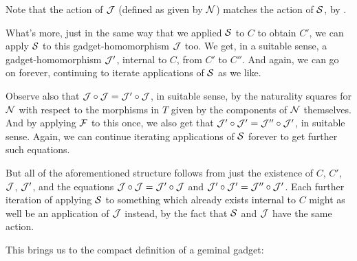 \begin{observation}
Note that the action of $\mathcal{J}$ (defined as given by $\mathcal{N}$) matches the action of $\mathcal{S}$, by .

What's more, just in the same way that we applied $\mathcal{S}$ to $C$ to obtain $C'$, we can apply $\mathcal{S}$ to this gadget-homomorphism $\mathcal{J}$ too. We get, in a suitable sense, a gadget-homomorphism $\mathcal{J}'$, internal to $C$, from $C'$ to $C''$. And again, we can go on forever, continuing to iterate applications of $\mathcal{S}$ as we like.

Observe also that $\mathcal{J} \circ \mathcal{J} = \mathcal{J}' \circ \mathcal{J}$, in suitable sense, by the naturality squares for $\mathcal{N}$ with respect to the morphisms in $T$ given by the components of $\mathcal{N}$ themselves. And by applying $\mathcal{F}$ to this once, we also get that $\mathcal{J}' \circ \mathcal{J}' = \mathcal{J}'' \circ \mathcal{J}'$, in suitable sense. Again, we can continue iterating applications of $\mathcal{S}$ forever to get further such equations.

But all of the aforementioned structure follows from just the existence of $C$, $C'$, $\mathcal{J}$, $\mathcal{J}'$, and the equations $\mathcal{J} \circ \mathcal{J} = \mathcal{J}' \circ \mathcal{J}$ and $\mathcal{J}' \circ \mathcal{J}' = \mathcal{J}'' \circ \mathcal{J}'$. Each further iteration of applying $\mathcal{S}$ to something which already exists internal to $C$ might as well be an application of $\mathcal{J}$ instead, by the fact that $\mathcal{S}$ and $\mathcal{J}$ have the same action.
\end{observation}

This brings us to the compact definition of a geminal gadget:

